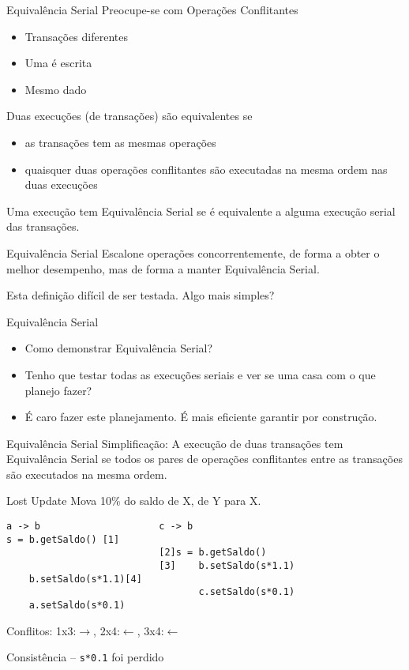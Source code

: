 \begin{frame}{Equivalência Serial}
Preocupe-se com Operações Conflitantes
\begin{itemize}
	\item Transações diferentes
	\item Uma é escrita
	\item Mesmo dado
\end{itemize}

Duas execuções (de transações) são equivalentes se
\begin{itemize}
	\item as transações tem as mesmas operações
	\item quaisquer duas operações conflitantes são executadas na mesma ordem nas duas execuções
\end{itemize}

Uma execução tem Equivalência Serial se é equivalente a alguma execução serial das transações.
\end{frame}

\begin{frame}{Equivalência Serial}
Escalone operações concorrentemente, de forma a obter o melhor desempenho, mas de forma a manter Equivalência Serial.
\end{frame}

Esta definição difícil de ser testada. Algo mais simples?

\begin{frame}{Equivalência Serial}
\begin{itemize}
	\item Como demonstrar Equivalência Serial? 
	\item Tenho que testar todas as execuções seriais e ver se uma casa com o que planejo fazer?
	\item É caro fazer este planejamento. É mais eficiente garantir por construção.
\end{itemize}
\end{frame}

\begin{frame}{Equivalência Serial}
Simplificação: A execução de duas transações tem Equivalência Serial se todos os pares de operações conflitantes entre as transações são executados na mesma ordem.
\end{frame}


\begin{frame}[fragile]{Lost Update}
Mova 10\% do saldo de X, de Y para X.
\begin{verbatim}
a -> b                     c -> b
s = b.getSaldo() [1]
                           [2]s = b.getSaldo()
                           [3]    b.setSaldo(s*1.1)
    b.setSaldo(s*1.1)[4]                                        
                                  c.setSaldo(s*0.1)
    a.setSaldo(s*0.1)
\end{verbatim}

Conflitos: 1x3:$\rightarrow$, 2x4:$\leftarrow$, 3x4:$\leftarrow$

\pause Consistência -- \verb|s*0.1| foi perdido
\end{frame}

